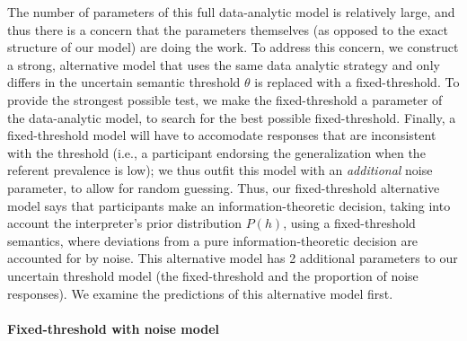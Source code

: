 \documentclass[english,floatsintext,man]{apa6}
\theoremstyle{definition}
\theoremstyle{definition}
\theoremstyle{definition}
\theoremstyle{remark}
\begin{document}
The number of parameters of this full data-analytic model is relatively
large, and thus there is a concern that the parameters themselves (as
opposed to the exact structure of our model) are doing the work. To
address this concern, we construct a strong, alternative model that uses
the same data analytic strategy and only differs in the uncertain
semantic threshold \(\theta\) is replaced with a fixed-threshold. To
provide the strongest possible test, we make the fixed-threshold a
parameter of the data-analytic model, to search for the best possible
fixed-threshold. Finally, a fixed-threshold model will have to
accomodate responses that are inconsistent with the threshold (i.e., a
participant endorsing the generalization when the referent prevalence is
low); we thus outfit this model with an \emph{additional} noise
parameter, to allow for random guessing. Thus, our fixed-threshold
alternative model says that participants make an information-theoretic
decision, taking into account the interpreter's prior distribution
\(P(h)\), using a fixed-threshold semantics, where deviations from a
pure information-theoretic decision are accounted for by noise. This
alternative model has 2 additional parameters to our uncertain threshold
model (the fixed-threshold and the proportion of noise responses). We
examine the predictions of this alternative model first.

\paragraph{Fixed-threshold with noise
model}\label{fixed-threshold-with-noise-model}
\end{document}
